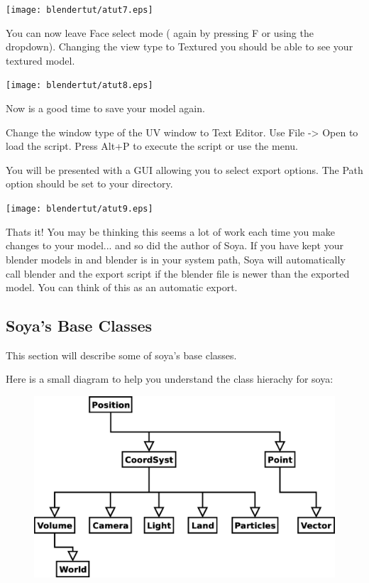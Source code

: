 \texttt{[image: blendertut/atut7.eps]}

You can now leave Face select mode ( again by pressing F or using the dropdown). 
Changing the view type to Textured you should be able to see your textured model. 

\texttt{[image: blendertut/atut8.eps]}

Now is a good time to save your model again. 

Change the window type of the UV window to Text Editor. Use File -> Open to 
load the  script. Press Alt+P to execute the script 
or use the menu. 

You will be presented with a GUI allowing you to select export options. 
The Path option should be set to your  directory. 

\texttt{[image: blendertut/atut9.eps]}

Thats it! You may be thinking this seems a lot of work each time you make 
changes to your model... and so did the author of Soya. If you have kept 
your blender models in  and blender is in your system
path, Soya will automatically call blender and the export script if the 
blender file is newer than the exported model. You can think of this 
as an automatic export. 


\subsection{Soya's Base Classes}

This section will describe some of soya's base classes. 

Here is a small diagram to help you understand the class hierachy for soya:

\begin{figure}
\includegraphics[scale=0.4]{classes.eps}
\end{figure}

